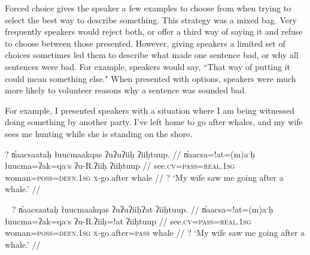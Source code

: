Forced choice gives the speaker a few examples to choose from when trying to select the best way to describe something. This strategy was a mixed bag. Very frequently speakers would reject both, or offer a third way of saying it and refuse to choose between those presented. However, giving speakers a limited set of choices sometimes led them to describe what made one sentence bad, or why all sentences were bad. For example, speakers would say, ``That way of putting it could mean something else." When presented with options, speakers were much more likely to volunteer reasons why a sentence was sounded bad.

For example, I presented speakers with a situation where I am being witnessed doing something by another party. I've left home to go after whales, and my wife sees me hunting while she is standing on the shore.

\ex \label{ex:goingafterwhale1}
\begingl
\glpreamble ? n̓aacsaataḥ łuucmaakqas ʔuʔuʔiiḥ ʔiiḥtuup. //
\gla n̓aacsa=!at=(m)aˑḥ łuucma=ʔak=qaˑs ʔu-R.ʔiiḥ ʔiiḥtuup //
\glb see.\textsc{cv}=\textsc{pass}=\textsc{real.1sg} woman=\textsc{poss}=\textsc{defn.1sg} \textsc{x}-go.after whale //
\glft ? `My wife saw me going after a whale.' //
\endgl
\xe

\ex~ \label{ex:goingafterwhale2}
\begingl
\glpreamble ? n̓aacsaataḥ łuucmaakqas ʔuʔuʔiiḥʔat ʔiiḥtuup. //
\gla n̓aacsa=!at=(m)aˑḥ łuucma=ʔak=qaˑs ʔu-R.ʔiiḥ=!at ʔiiḥtuup //
\glb see.\textsc{cv}=\textsc{pass}=\textsc{real.1sg} woman=\textsc{poss}=\textsc{defn.1sg} \textsc{x}-go.after=\textsc{pass} whale //
\glft ? `My wife saw me going after a whale.' //
\endgl
\xe


\begin{comment}
\ex \label{becauseofbaby1}
\begingl
\glpreamble ? ʔuusaaḥimta nay̓aqakʔi wikitaḥ ƛuł weʔič. //
\gla ʔuusaaḥi=(m)it=maˑ nay̓aqak=ʔiˑ wik=(m)it=(m)aˑḥ ƛuł weʔič //
\glb because.of=\textsc{pst}=\textsc{real.3} baby=\textsc{art} \textsc{neg}=\textsc{pst}=\textsc{real.1sg} good sleep //
\glft ? `I didn't sleep well because of the baby.' //
\endgl
\xe

\ex~ \label{becauseofbaby2}
\begingl
\glpreamble ? ʔuusaaḥiqḥita nay̓aqakʔi wikitaḥ ƛuł weʔič. //
\gla ʔuusaaḥi-(q)ḥ=(m)it=maˑ nay̓aqak=ʔiˑ wik=(m)it=(m)aˑḥ ƛuł weʔič //
\glb because.of-\textsc{link}=\textsc{pst}=\textsc{real.3} baby=\textsc{art} \textsc{neg}=\textsc{pst}=\textsc{real.1sg} good sleep //
\glft ? `I didn't sleep well because of the baby.' //
\endgl
\xe
\end{comment}

